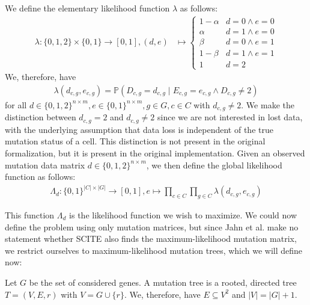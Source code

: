 \begin{definition}
    \label{def:likelihood}
    We define the elementary likelihood function $\lambda$ as follows:
    \begin{align*}
        \lambda: \{0, 1, 2\} \times \{0, 1\} \rightarrow [0, 1], (d, e) &\mapsto \begin{cases}
            1-\alpha & d = 0 \wedge e = 0 \\
            \alpha & d = 1 \wedge e = 0 \\
            \beta & d = 0 \wedge e = 1 \\
            1-\beta & d = 1 \wedge e = 1 \\
            1 & d = 2
        \end{cases}
    \end{align*}
    We, therefore, have 
    \begin{align*}
        \lambda(d_{c,g}, e_{c,g}) = \mathbb{P}(D_{c,g} = d_{c,g} \mid E_{c,g} = e_{c,g} \wedge D_{c,g} \neq 2)
    \end{align*}
    for all $d \in \{0,1,2\}^{n \times m}, e \in \{0,1\}^{n \times m}, g \in G, c \in C$ with $d_{c,g} \neq 2$. We make the distinction between $d_{c,g} = 2$ and $d_{c,g} \neq 2$ since we are not interested in lost data, with the underlying assumption that data loss is independent of the true mutation status of a cell. This distinction is not present in the original formalization, but it is present in the original implementation. Given an observed mutation data matrix $d \in \{0,1,2\}^{n \times m}$, we then define the global likelihood function as follows:
    \begin{align*}
        \Lambda_d : \{0,1\}^{|C| \times |G|} \rightarrow [0,1], e \mapsto \prod_{c \in C} \prod_{g \in C} \lambda(d_{c,g}, e_{c,g})
    \end{align*}
\end{definition}

This function $\Lambda_d$ is the likelihood function we wish to maximize. We could now define the problem using only mutation matrices, but since Jahn et al. make no statement whether \ac{SCITE} also finds the maximum-likelihood mutation matrix, we restrict ourselves to maximum-likelihood mutation trees, which we will define now:

\begin{definition}
    \label{def:mutation_tree}
    Let $G$ be the set of considered genes. A mutation tree is a rooted, directed tree $T = (V, E, r)$ with $V = G \cup \{r\}$. We, therefore, have $E \subseteq V^2$ and $|V| = |G| + 1$.
\end{definition}

